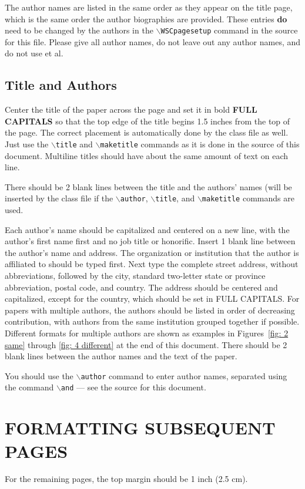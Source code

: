 \documentclass{wscpaperproc}
\theoremstyle{wsc}
\begin{document}
The author names are listed in the same order as they appear on the title page, which is the same order the author biographies are provided.
These entries {\bf do} need to be changed by the authors in the {\tt $\backslash$WSCpagesetup} command in the source for this file.
Please give all author names, do not leave out any author names, and do not use et al.


\subsection{Title and Authors}
Center the title of the paper across the page and set it in bold {\bf FULL CAPITALS} so that the top edge of the title begins 1.5 inches from the top of the page.
The correct placement is automatically done by the class file as well.
Just use the {\tt $\backslash$title} and {\tt $\backslash$maketitle} commands as it is done in the source of this document.
Multiline titles should have about the same amount of text on each line.

There should be 2 blank lines between the title and the authors' names (will be inserted by the class file if the {\tt $\backslash$author}, {\tt $\backslash$title}, and {\tt $\backslash$maketitle} commands are used.

Each author's name should be capitalized and centered on a new line, with the author's first name first and no job title or honorific.
Insert 1 blank line between the author's name and address. The organization or institution that the author is affiliated to should be typed first.
Next type the complete street address, without abbreviations, followed by the city, standard two-letter state or province abbreviation, postal code, and country.
The address should be centered and capitalized, except for the country, which should be set in FULL CAPITALS.
For papers with multiple authors, the authors should be listed in order of decreasing contribution, with authors from the same institution grouped together if possible.
Different formats for multiple authors are shown as examples in Figures~\ref{fig: 2 same} through \ref{fig: 4 different} at the end of this document.
There should be 2 blank lines between the author names and the text of the paper.

You should use the {\tt $\backslash$author} command to enter author names, separated using the command {\tt $\backslash$and} --- see the source for this document.

\section{FORMATTING SUBSEQUENT PAGES}
For the remaining pages, the top margin should be 1 inch (2.5 cm).
\end{document}
